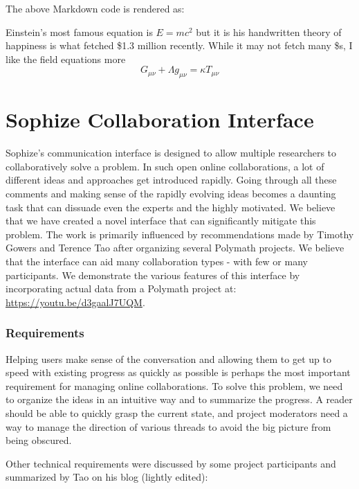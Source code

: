 \documentclass[a4paper]{article}
\begin{document}
The above Markdown code is rendered as:
\begin{mdframed}
Einstein's most famous equation is $E=mc^2$ but it is his handwritten theory of happiness is
what fetched \$1.3 million recently. While it may not fetch many \$s, I like the field
equations more $$G_{\mu \nu }+\Lambda g_{\mu \nu }=\kappa T_{\mu \nu }$$
\end{mdframed}



\section{Sophize Collaboration Interface}

Sophize's communication interface is designed to allow multiple researchers to collaboratively solve a problem. In such open online collaborations, a lot of different ideas and approaches get introduced rapidly. Going through all these comments and making sense of the rapidly evolving ideas becomes a daunting task that can dissuade even the experts and the highly motivated. We believe that we have created a novel interface that can significantly mitigate this problem. The work is primarily influenced by recommendations made by Timothy Gowers and Terence Tao after organizing several Polymath projects\cite{polymath_blog}. We believe that the interface can aid many collaboration types - with few or many participants. We demonstrate the various features of this interface by incorporating actual data from a Polymath project at: \url{https://youtu.be/d3gaalJ7UQM}.


\subsubsection*{Requirements}

Helping users make sense of the conversation and allowing them to get up to speed with existing progress as quickly as possible is perhaps the most important requirement for managing online collaborations. To solve this problem, we need to organize the ideas in an intuitive way and to summarize the progress. A reader should be able to quickly grasp the current state, and project moderators need a way to manage the direction of various threads to avoid the big picture from being obscured.


Other technical requirements were discussed by some project participants and summarized by Tao on his blog\cite{whats_new_2009} (lightly edited):
\end{document}
